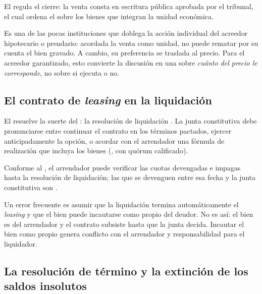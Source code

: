 El  regula el cierre: la venta consta en escritura pública aprobada por el tribunal, el
cual ordena el  sobre
los bienes que integran la unidad económica.

\begin{foco}
Es una de las pocas instituciones que doblega la acción individual del acreedor hipotecario o
prendario: acordada la venta como unidad, no puede rematar por su cuenta el bien gravado. A
cambio, su preferencia se traslada al precio. Para el acreedor garantizado, esto convierte la
discusión en una sobre \emph{cuánto del precio le corresponde}, no sobre si ejecuta o no.
\end{foco}

\subsection{El contrato de \emph{leasing} en la liquidación}

El  resuelve la suerte del : la resolución
de liquidación . La junta constitutiva debe
pronunciarse entre continuar el contrato en los términos pactados, ejercer anticipadamente la
opción, o acordar con el arrendador una fórmula de realización que incluya los bienes (,
con quórum calificado).

Conforme al , el arrendador puede verificar las cuotas devengadas e impagas hasta la
resolución de liquidación; las que se devenguen entre esa fecha y la junta constitutiva son
.

\begin{alerta}
Un error frecuente es asumir que la liquidación termina automáticamente el \emph{leasing} y que
el bien puede incautarse como propio del deudor. No es así: el bien es del arrendador y el
contrato subsiste hasta que la junta decida. Incautar el bien como propio genera conflicto con
el arrendador y responsabilidad para el liquidador.
\end{alerta}

\subsection{La resolución de término y la extinción de los saldos insolutos}

